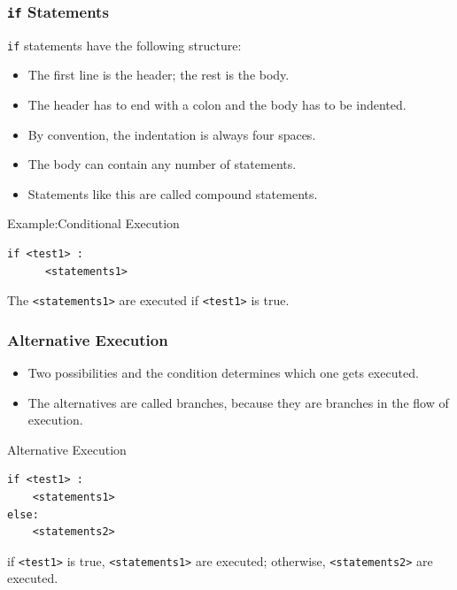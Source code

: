 \documentclass{beamer}
\begin{document}
\begin{frame}[fragile]
\frametitle{ \texttt{if} Statements}

 \texttt{if} statements have the following structure:
\begin{itemize}
\item The first line is the \alert{header}; the rest is the \alert{body}. 
\item The header has to end with a \alert{colon} and the body has to be \alert{indented}.
\item  By convention, the indentation is always \alert{four spaces}.  
\item The body can contain any number of statements.
\item Statements like this are called \alert{compound statements}.
%
%
\end{itemize}
\begin{block}{Example:Conditional Execution}
\tiny
\begin{verbatim}
if <test1> :
      <statements1>
\end{verbatim}
The \verb!<statements1>! are executed if \verb!<test1>! is \alert{true}.
\end{block}

\end{frame}

\begin{frame}[fragile]
\frametitle{Alternative Execution}
\begin{itemize}
\item Two possibilities and
the condition determines which one gets executed.
\item The alternatives are called
\alert{branches}, because they are branches in the flow of execution.
\end{itemize} 
 \begin{block}{Alternative Execution} 

\tiny
\begin{verbatim}
if <test1> :
    <statements1>
else:
    <statements2>
\end{verbatim}
\small
if \verb!<test1>! is \alert{true}, \verb!<statements1>! are executed; otherwise, 
\verb!<statements2>! are executed.
\end{block}

\end{frame}
\end{document}
